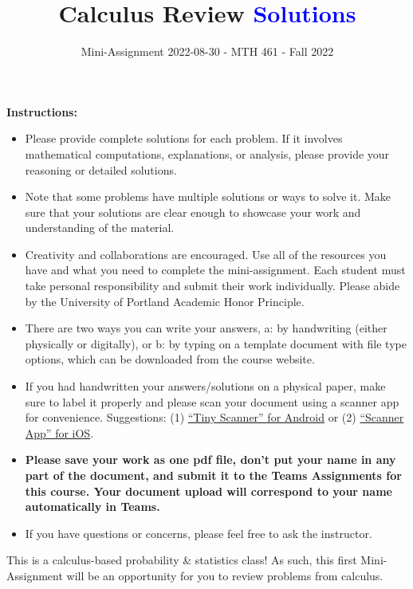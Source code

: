 \documentclass[
]{article}
\title{\textbf{Calculus Review \textcolor{blue}{Solutions}}}
\subtitle{Mini-Assignment 2022-08-30 - MTH 461 - Fall 2022}
\author{}
\date{\vspace{-2.5em}}
\begin{document}
\maketitle

\hfill\break

\textbf{Instructions:}

\begin{itemize}
\item
  Please provide complete solutions for each problem. If it involves mathematical computations, explanations, or analysis, please provide your reasoning or detailed solutions.
\item
  Note that some problems have multiple solutions or ways to solve it. Make sure that your solutions are clear enough to showcase your work and understanding of the material.
\item
  Creativity and collaborations are encouraged. Use all of the resources you have and what you need to complete the mini-assignment. Each student must take personal responsibility and submit their work individually. Please abide by the University of Portland Academic Honor Principle.
\item
  There are two ways you can write your answers, a: by handwriting (either physically or digitally), or b: by typing on a template document with file type options, which can be downloaded from the course website.
\item
  If you had handwritten your answers/solutions on a physical paper, make sure to label it properly and please scan your document using a scanner app for convenience. Suggestions: (1) \href{https://play.google.com/store/apps/details?id=com.appxy.tinyscanner\&hl=en_US\&gl=US}{``Tiny Scanner'' for Android} or (2) \href{https://apps.apple.com/us/app/scanner-app-scan-pdf-document/id595563753}{``Scanner App'' for iOS}.
\item
  \textbf{Please save your work as one pdf file, don't put your name in any part of the document, and submit it to the Teams Assignments for this course. Your document upload will correspond to your name automatically in Teams.}
\item
  If you have questions or concerns, please feel free to ask the instructor.
\end{itemize}

\newpage

This is a calculus-based probability \& statistics class! As such, this first Mini-Assignment will be an opportunity for you to review problems from calculus.
\end{document}
